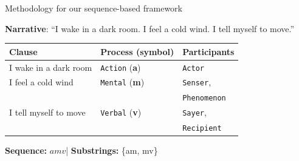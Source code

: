 \documentclass[handout,10pt]{beamer}
\begin{document}

\begin{frame}{Methodology for our sequence-based framework}



\textbf{Narrative}: \small{“I wake in a dark room. I feel a cold wind. I tell myself to move.”} %




\begin{table}[!ht]
  \centering
  \renewcommand{\arraystretch}{1.8}
  \begin{threeparttable}
    \label{tab:example}
    \begin{tabular}{lll}
      \textbf{Clause} & \textbf{Process (symbol)} & \textbf{Participants} \\
      \midrule
      I wake in a dark room         & \texttt{Action} (\textbf{a})  & \texttt{Actor} \\
      I feel a cold wind            & \texttt{Mental} (\textbf{m})  & \texttt{Senser},\\
                                            &             & \texttt{Phenomenon} \\
      I tell myself to move         & \texttt{Verbal} (\textbf{v})  & \texttt{Sayer},\\
                                            &             & \texttt{Recipient} \\
      \bottomrule
    \end{tabular}

    \begin{tablenotes}[flushleft]
      \item \textbf{Sequence:} $amv$\quad|\quad
            \textbf{Substrings:} \{am, mv\}
    \end{tablenotes}
  \end{threeparttable}
\end{table}


\end{frame}
\end{document}
